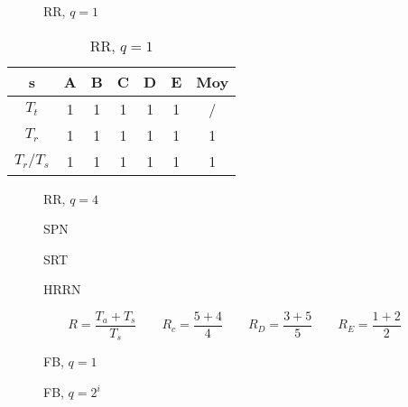 \documentclass[a4, 11pt]{article}
\begin{document}
   \begin{figure}[h!]
      \centering
      
      \caption{RR, $q=1$}
      \label{fig:rr}
   \end{figure}

   \begin{table}[ht!]
      \centering
      \begin{tabular}{c|c|c|c|c|c|c}
         s       & A & B & C & D & E & Moy \\ \hline
         $T_t$   & 1 & 1 & 1 & 1 & 1 & / \\ \hline
         $T_r$   & 1 & 1 & 1 & 1 & 1 & 1 \\ \hline
         $T_r / T_s$ & 1 & 1 & 1 & 1 & 1 & 1 \\
      \end{tabular}
      \caption{RR, $q=1$}
      \label{tab:rrq1}

   \end{table}

   \begin{figure}
      \centering
      
      \caption{RR, $q=4$}
      \label{fig:rrq4}
   \end{figure}

   \begin{figure}
      \centering
      
      \caption{SPN}
      \label{fig:spn}
   \end{figure}

   \begin{figure}
      \centering
      
      \caption{SRT}
      \label{fig:srt}
   \end{figure}

   \begin{figure}[h!]
      \centering
      
      \caption{HRRN}
      \label{fig:hrrn}
   \end{figure}
   \[\boxed{R = \frac{T_a + T_s}{T_s}} \qquad R_c = \frac{5+4}{4} \qquad R_D = \frac{3+5}{5} \qquad R_E = \frac{1+2}{2}\]

   \begin{figure}
      \centering
      
      \caption{FB, $q=1$}
      \label{fig:fbq1}
   \end{figure}

   \begin{figure}
      \centering
      
      \caption{FB, $q=2^i$}
      \label{fig:fbqi}
   \end{figure}
\end{document}
